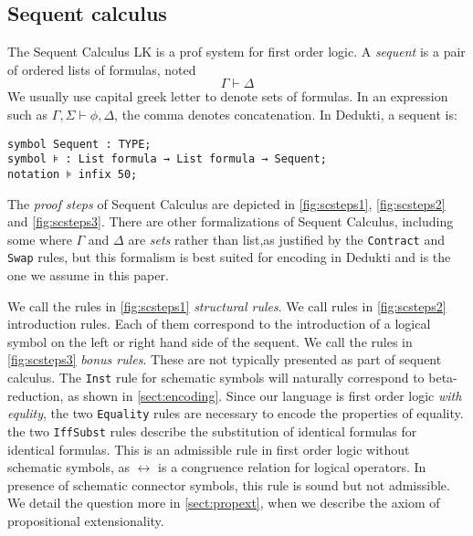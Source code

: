 \documentclass{article}
\begin{document}
	\fi
	
	\subsection{Sequent calculus}
	The Sequent Calculus LK is a prof system for first order logic. A \textit{sequent} is a pair of ordered lists of formulas, noted
	$$
	\Gamma \vdash \Delta
	$$
	We usually use capital greek letter to denote sets of formulas. In an expression such as $\Gamma, \Sigma \vdash \phi, \Delta$, the comma denotes concatenation. In Dedukti, a sequent is:
	\begin{lstlisting}[language=Dialekto]
symbol Sequent : TYPE;
symbol ⊧ : List formula → List formula → Sequent;
notation ⊧ infix 50;
	\end{lstlisting}
	The \textit{proof steps} of Sequent Calculus are depicted in \autoref{fig:scsteps1}, \autoref{fig:scsteps2} and \autoref{fig:scsteps3}. There are other formalizations of Sequent Calculus, including some where $\Gamma$ and $\Delta$ are \textit{sets} rather than list,as justified by the \texttt{Contract} and \texttt{Swap} rules, but this formalism is best suited for encoding in Dedukti and is the one we assume in this paper.
	
	We call the rules in \autoref{fig:scsteps1} \textit{structural rules}. We call rules in \autoref{fig:scsteps2} introduction rules. Each of them correspond to the introduction of a logical symbol on the left or right hand side of the sequent.
	We call the rules in \autoref{fig:scsteps3} \textit{bonus rules}. These are not typically presented as part of sequent calculus. 
	The \texttt{Inst} rule for schematic symbols will naturally correspond to beta-reduction, as shown in \autoref{sect:encoding}.
	Since our language is first order logic \textit{with equlity}, the two \texttt{Equality} rules are necessary to encode the properties of equality. the two \texttt{IffSubst} rules describe the substitution of identical formulas for identical formulas. This is an admissible rule in first order logic without schematic symbols, as $\leftrightarrow$ is a congruence relation for logical operators. In presence of schematic connector symbols, this rule is sound but not admissible. We detail the question more in \autoref{sect:propext}, when we describe the axiom of propositional extensionality.
	
\end{document}
